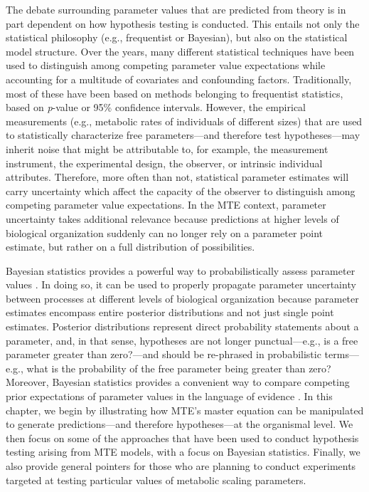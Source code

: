 \documentclass[a4paper,12pt]{article}
\begin{document}
The debate surrounding parameter values that are predicted from theory is in part dependent on how hypothesis testing is conducted. This entails not only the statistical philosophy (e.g., frequentist or Bayesian), but also on the statistical model structure. Over the years, many different statistical techniques have been used to distinguish among competing parameter value expectations while accounting for a multitude of covariates and confounding factors. Traditionally, most of these have been based on methods belonging to frequentist statistics, based on \emph{p}-value or 95\% confidence intervals. However, the empirical measurements (e.g., metabolic rates of individuals of different sizes) that are used to statistically characterize free parameters---and therefore test hypotheses---may inherit noise that might be attributable to, for example, the measurement instrument, the experimental design, the observer, or intrinsic individual attributes. Therefore, more often than not, statistical parameter estimates will carry uncertainty which affect the capacity of the observer to distinguish among competing parameter value expectations. In the MTE context, parameter uncertainty takes additional relevance because predictions at higher levels of biological organization suddenly can no longer rely on a parameter point estimate, but rather on a full distribution of possibilities.

Bayesian statistics provides a powerful way to probabilistically assess parameter values \citep{kruscke2018psybullrev,gelman2020book}. In doing so, it can be used to properly propagate parameter uncertainty between processes at different levels of biological organization \citep[not discussed here, but see e.g.,][for examples that are relevant to MTE]{barneche2014ele, barneche2016procb} because parameter estimates encompass entire posterior distributions and not just single point estimates. Posterior distributions represent direct probability statements about a parameter, and, in that sense, hypotheses are not longer punctual---e.g., is a free parameter greater than zero?---and should be re-phrased in probabilistic terms---e.g., what is the probability of the free parameter being greater than zero? Moreover, Bayesian statistics provides a convenient way to compare competing prior expectations of parameter values in the language of evidence \citep{benjamin2017nathumbeh,
lakens2022tree}. In this chapter, we begin by illustrating how MTE's master equation can be manipulated to generate predictions---and therefore hypotheses---at the organismal level. We then focus on some of the approaches that have been used to conduct hypothesis testing arising from MTE models, with a focus on Bayesian statistics. Finally, we also provide general pointers for those who are planning to conduct experiments targeted at testing particular values of metabolic scaling parameters.
\end{document}
